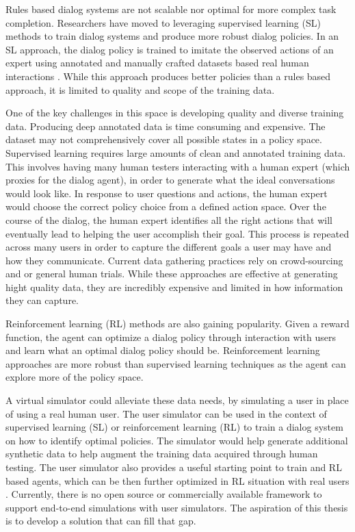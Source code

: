 Rules based dialog systems are not scalable nor optimal for more complex task completion. Researchers have moved to leveraging supervised learning (SL) methods to train dialog systems and produce more robust dialog policies. In an SL approach, the dialog policy is trained to imitate the observed actions of an expert using annotated and manually crafted datasets based real human interactions \cite{Schatzmann2006ASO}. While this approach produces better policies than a rules based approach, it is limited to quality and scope of the training data. 

One of the key challenges in this space is developing quality and diverse training data. Producing deep annotated data is time consuming and expensive. The dataset may not comprehensively cover all possible states in a policy space. Supervised learning requires large amounts of clean and annotated training data. This involves having many human testers interacting with a human expert (which proxies for the dialog agent), in order to generate what the ideal conversations would look like. In response to user questions and actions, the human expert would choose the correct policy choice from a defined action space. Over the course of the dialog, the human expert identifies all the right actions that will eventually lead to helping the user accomplish their goal. This process is repeated across many users in order to capture the different goals a user may have and how they communicate. Current data gathering practices rely on crowd-sourcing and or general human trials. While these approaches are effective at generating hight quality data, they are incredibly expensive and limited in how information they can capture.  

Reinforcement learning (RL) methods are also gaining popularity. Given a reward function, the agent can optimize a dialog policy through interaction with users and learn what an optimal dialog policy should be. Reinforcement learning approaches are more robust than supervised learning techniques as the agent can explore more of the policy space.

A virtual simulator could alleviate these data needs, by simulating a user in place of using a real human user. The user simulator can be used in the context of supervised learning (SL) or reinforcement learning (RL) to train a dialog system on how to identify optimal policies. The simulator would help generate additional synthetic data to help augment the training data acquired through human testing. The user simulator also provides a useful starting point to train and RL based agents, which can be then further optimized in RL situation with real users \cite{li_usersim}. Currently, there is no open source or commercially available framework to support end-to-end simulations with user simulators. The aspiration of this thesis is to develop a solution that can fill that gap. 


